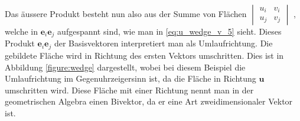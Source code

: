 Das äussere Produkt besteht nun also aus der Summe 
    von Flächen 
    \(\begin{vmatrix} 
    	u_i & v_i \\
    	u_j & v_j
    \end{vmatrix}\)
, welche in $\textbf{e}_i\textbf{e}_j$ aufgespannt sind, wie man in \eqref{eq:u_wedge_v_5} sieht. 
Dieses Produkt $\textbf{e}_i\textbf{e}_j$ der Basisvektoren interpretiert man als Umlaufrichtung.
%
Die gebildete Fläche wird in Richtung des ersten Vektors umschritten. 
Dies ist in Abbildung \ref{figure:wedge} dargestellt, wobei bei diesem Beispiel die Umlaufrichtung im Gegenuhrzeigersinn ist, da die Fläche in Richtung $\textbf{u}$ umschritten wird. 
Diese Fläche mit einer Richtung nennt man in der geometrischen Algebra einen Bivektor, da er eine Art zweidimensionaler Vektor ist. 
%
